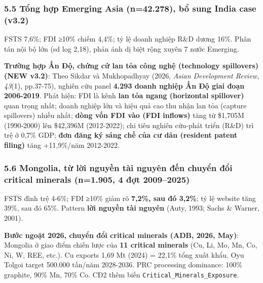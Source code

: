 \documentclass[12pt,a4paper]{article}
\begin{document}
\hypertarget{55-tux1ed5ng-hux1ee3p-emerging-asia-n42278-bux1ed5-sung-india-case-v32}{%
\subsubsection{5.5 Tổng hợp Emerging Asia (n=42.278), bổ sung India case
(v3.2)}\label{55-tux1ed5ng-hux1ee3p-emerging-asia-n42278-bux1ed5-sung-india-case-v32}}

FSTS 7,6\%; FDI ≥10\% chiếm 4,4\%; tỷ lệ doanh nghiệp R\&D dương 16\%.
Phân tán nội bộ lớn (sd log 2,18), phản ánh dị biệt rộng xuyên 7 nước
Emerging.

\textbf{Trường hợp Ấn Độ, chứng cứ lan tỏa công nghệ (technology
spillovers) (NEW v3.2)}: Theo Sikdar và Mukhopadhyay (2026, \emph{Asian
Development Review, 43}(1), pp.37-75), nghiên cứu panel \textbf{4.293
doanh nghiệp Ấn Độ giai đoạn 2006-2019}. Phát hiện: FDI là kênh
\textbf{lan tỏa ngang (horizontal spillover)} quan trọng nhất; doanh
nghiệp lớn và hiệu quả cao thu nhận lan tỏa (capture spillovers) nhiều
nhất; \textbf{dòng vốn FDI vào (FDI inflows)} tăng từ \$1,705M
(1990-2000) lên \$42,396M (2012-2022); chi tiêu nghiên cứu-phát triển
(R\&D) trì trệ ở 0,7\% GDP; \textbf{đơn đăng ký sáng chế của cư dân
(resident patent filing)} tăng +11,9\%/năm 2012-2022.

\hypertarget{56-mongolia-tux1eeb-lux1eddi-nguyux1ec1n-tuxe0i-nguyuxean-ux111ux1ebfn-chuyux1ec3n-ux111ux1ed5i-critical-minerals-n1905-4-ux111ux1ee3t-20092025}{%
\subsubsection{5.6 Mongolia, từ lời nguyền tài nguyên đến chuyển đổi
critical minerals (n=1.905, 4 đợt
2009--2025)}\label{56-mongolia-tux1eeb-lux1eddi-nguyux1ec1n-tuxe0i-nguyuxean-ux111ux1ebfn-chuyux1ec3n-ux111ux1ed5i-critical-minerals-n1905-4-ux111ux1ee3t-20092025}}

FSTS đình trệ 4-6\%; FDI ≥10\% giảm rõ \textbf{7,2\%, sau đó 3,2\%}; tỷ
lệ website tăng 39\%, sau đó 65\%. Pattern \textbf{lời nguyền tài
nguyên} (Auty, 1993; Sachs \& Warner, 2001).

\textbf{Bước ngoặt 2026, chuyển đổi critical minerals (ADB, 2026, May)}:
Mongolia ở giao điểm chiến lược của \textbf{11 critical minerals} (Cu,
Li, Mo, Mn, Co, Ni, W, REE, etc.). Cu exports 1,69 Mt (2024) = 22,1\%
tổng xuất khẩu. Oyu Tolgoi target 500.000 tấn/năm 2028-2036. PRC
processing dominance: 100\% graphite, 90\% Mn, 70\% Co. CĐ2 thêm biến
\texttt{Critical\_Minerals\_Exposure}.
\end{document}
